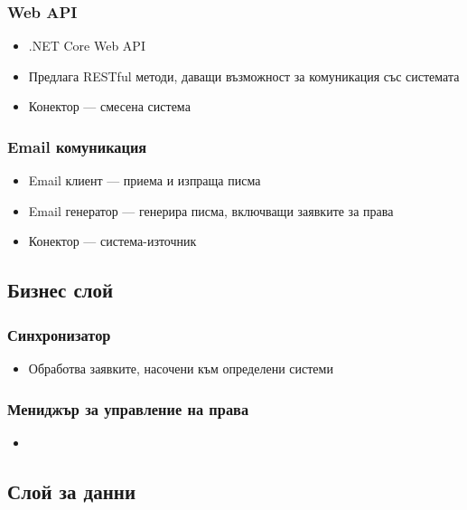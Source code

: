 \documentclass[bulgarian,a4paper,12pt,titlepage]{article}
\begin{document}
            \subsubsection{Web API}
                \begin{itemize}
                    \item .NET Core Web API
                    \item Предлага RESTful методи, даващи възможност за комуникация със системата
                    \item Конектор --- смесена система
                \end{itemize}

            \subsubsection{Email комуникация}
                \begin{itemize}
                    \item Email клиент --- приема и изпраща писма
                    \item Email генератор --- генерира писма, включващи заявките за права
                    \item Конектор --- система-източник
                \end{itemize}

            
        \subsection{Бизнес слой}
            \subsubsection{Синхронизатор}
                \begin{itemize}
                    \item Обработва заявките, насочени към определени системи
                \end{itemize}

            \subsubsection{Мениджър за управление на права}
                \begin{itemize}
                    \item 
                \end{itemize}
        \subsection{Слой за данни}
\end{document}
